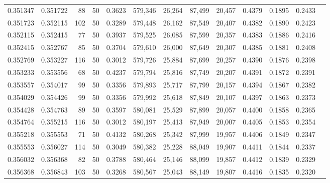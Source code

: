 \begin{tabular}{rrrrrrrrrrrrr}
0.351347 & 0.351722 &    88 &  50 &                                     0.3623 & 579,346 &  26,264 &  87,499 &  20,457 & 0.4379 & 0.1895 & 0.2433 \\
0.351723 & 0.352115 &   102 &  50 &                                     0.3289 & 579,448 &  26,162 &  87,549 &  20,407 & 0.4382 & 0.1890 & 0.2423 \\
0.352115 & 0.352415 &    77 &  50 &                                     0.3937 & 579,525 &  26,085 &  87,599 &  20,357 & 0.4383 & 0.1886 & 0.2416 \\
0.352415 & 0.352767 &    85 &  50 &                                     0.3704 & 579,610 &  26,000 &  87,649 &  20,307 & 0.4385 & 0.1881 & 0.2408 \\
0.352769 & 0.353227 &   116 &  50 &                                     0.3012 & 579,726 &  25,884 &  87,699 &  20,257 & 0.4390 & 0.1876 & 0.2398 \\
0.353233 & 0.353556 &    68 &  50 &                                     0.4237 & 579,794 &  25,816 &  87,749 &  20,207 & 0.4391 & 0.1872 & 0.2391 \\
0.353557 & 0.354017 &    99 &  50 &                                     0.3356 & 579,893 &  25,717 &  87,799 &  20,157 & 0.4394 & 0.1867 & 0.2382 \\
0.354029 & 0.354426 &    99 &  50 &                                     0.3356 & 579,992 &  25,618 &  87,849 &  20,107 & 0.4397 & 0.1863 & 0.2373 \\
0.354428 & 0.354763 &    89 &  50 &                                     0.3597 & 580,081 &  25,529 &  87,899 &  20,057 & 0.4400 & 0.1858 & 0.2365 \\
0.354764 & 0.355215 &   116 &  50 &                                     0.3012 & 580,197 &  25,413 &  87,949 &  20,007 & 0.4405 & 0.1853 & 0.2354 \\
0.355218 & 0.355553 &    71 &  50 &                                     0.4132 & 580,268 &  25,342 &  87,999 &  19,957 & 0.4406 & 0.1849 & 0.2347 \\
0.355553 & 0.356027 &   114 &  50 &                                     0.3049 & 580,382 &  25,228 &  88,049 &  19,907 & 0.4411 & 0.1844 & 0.2337 \\
0.356032 & 0.356368 &    82 &  50 &                                     0.3788 & 580,464 &  25,146 &  88,099 &  19,857 & 0.4412 & 0.1839 & 0.2329 \\
0.356368 & 0.356843 &   103 &  50 &                                     0.3268 & 580,567 &  25,043 &  88,149 &  19,807 & 0.4416 & 0.1835 & 0.2320 \\

\end{tabular}
